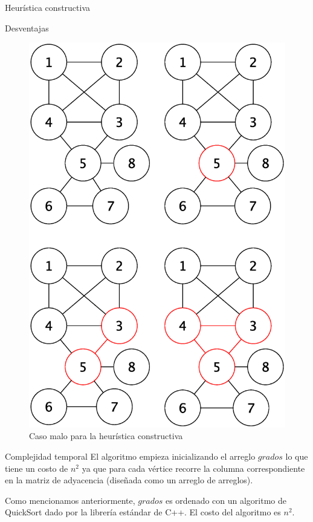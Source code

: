 \begin{section}{Heurística constructiva}
\begin{subsection}{Desventajas }
			\begin{figure}[H]
				\centering
		    	\includegraphics[scale=0.5]{constructivo/segCasoMalo.eps}
			    \caption{Caso malo para la heurística constructiva}
			    \label{fig:seguimiento_caso_malo}
			\end{figure}
		\end{subsection}
		\begin{subsection}{Complejidad temporal}
			El algoritmo empieza inicializando el arreglo $grados$ lo que tiene un costo de $n^2$ ya que para cada vértice recorre la columna correspondiente en la matriz de adyacencia (diseñada como un arreglo de arreglos).
			
			Como mencionamos anteriormente, $grados$ es ordenado con un algoritmo de QuickSort dado por la librería estándar de C++. El costo del algoritmo es $n^2$.
			

\end{subsection}
\end{section}
